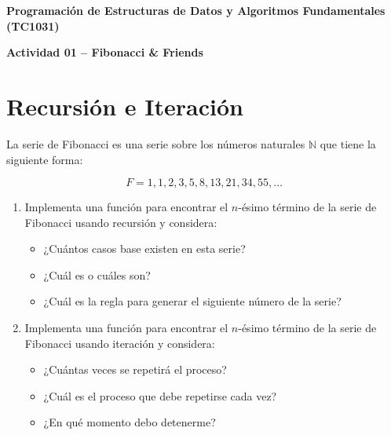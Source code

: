 \documentclass[spanish, 10pt]{article}
\begin{document}
\begin{center}
    {\Large \textbf{Programación de Estructuras de Datos y Algoritmos Fundamentales \\ (TC1031)}}
	
	\bigskip
	{\large \textbf{Actividad 01 -- Fibonacci \& Friends}}
\end{center}

\bigskip



\bigskip

\bigskip


\section*{Recursión e Iteración}

La serie de Fibonacci es una serie sobre los números naturales $\mathbb{N}$ que tiene la siguiente forma:
\vspace{2.5ex}

$$F = 1, 1, 2, 3, 5, 8, 13, 21, 34, 55, \dots$$

\vspace{2.5ex}

\begin{enumerate}
    \itemsep2.5ex
    \item Implementa una función para encontrar el $n$-ésimo término de la serie de Fibonacci usando recursión y considera:
    \begin{itemize}
		\item ¿Cuántos casos base existen en esta serie?
		\item ¿Cuál es o cuáles son?
		\item ¿Cuál es la regla para generar el siguiente número de la serie?
	\end{itemize}
	\item Implementa una función para encontrar el $n$-ésimo término de la serie de Fibonacci usando iteración y considera:
	\begin{itemize}
		\item ¿Cuántas veces se repetirá el proceso?
		\item ¿Cuál es el proceso que debe repetirse cada vez?
		\item ¿En qué momento debo detenerme?
	\end{itemize}
\end{enumerate}
\end{document}

